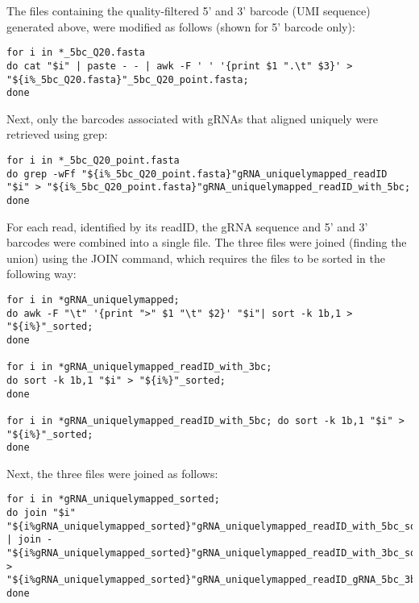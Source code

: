 The files containing the quality-filtered 5' and 3' barcode (UMI sequence) generated above, were modified as follows (shown for 5' barcode only):

\begin{small}\begin{lstlisting}
for i in *_5bc_Q20.fasta
do cat "$i" | paste - - | awk -F ' ' '{print $1 ".\t" $3}' > "${i%_5bc_Q20.fasta}"_5bc_Q20_point.fasta;
done
\end{lstlisting}\end{small}

Next, only the barcodes associated with gRNAs that aligned uniquely were retrieved using grep:

\begin{small}\begin{lstlisting}
for i in *_5bc_Q20_point.fasta
do grep -wFf "${i%_5bc_Q20_point.fasta}"gRNA_uniquelymapped_readID "$i" > "${i%_5bc_Q20_point.fasta}"gRNA_uniquelymapped_readID_with_5bc;
done
\end{lstlisting}\end{small}

For each read, identified by its readID, the gRNA sequence and 5' and 3' barcodes were combined into a single file. The three files were joined (finding the union) using the JOIN command, which requires the files to be sorted in the following way:

\begin{small}\begin{lstlisting}
for i in *gRNA_uniquelymapped;
do awk -F "\t" '{print ">" $1 "\t" $2}' "$i"| sort -k 1b,1 > "${i%}"_sorted;
done

for i in *gRNA_uniquelymapped_readID_with_3bc;
do sort -k 1b,1 "$i" > "${i%}"_sorted;
done

for i in *gRNA_uniquelymapped_readID_with_5bc; do sort -k 1b,1 "$i" > "${i%}"_sorted;
done
\end{lstlisting}\end{small}

Next, the three files were joined as follows:

\begin{small}\begin{lstlisting}
for i in *gRNA_uniquelymapped_sorted;
do join "$i" "${i%gRNA_uniquelymapped_sorted}"gRNA_uniquelymapped_readID_with_5bc_sorted | join - "${i%gRNA_uniquelymapped_sorted}"gRNA_uniquelymapped_readID_with_3bc_sorted > "${i%gRNA_uniquelymapped_sorted}"gRNA_uniquelymapped_readID_gRNA_5bc_3bc_length14;
done
\end{lstlisting}\end{small}

